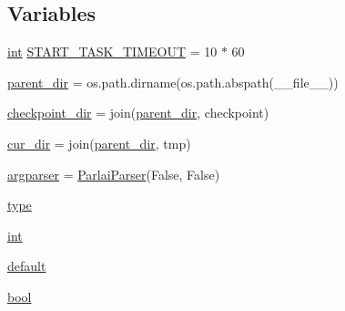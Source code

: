 \subsection*{Variables}
\begin{DoxyCompactItemize}
\item 
\hyperlink{namespaceprojects_1_1mastering__the__dungeon_1_1mturk_1_1tasks_1_1MTD_1_1run_a693eb03afbb820bbfe8b47b12e69e519}{int} \hyperlink{namespaceprojects_1_1mastering__the__dungeon_1_1mturk_1_1tasks_1_1MTD_1_1run_af458de97c8b5509492347c345c246acd}{S\+T\+A\+R\+T\+\_\+\+T\+A\+S\+K\+\_\+\+T\+I\+M\+E\+O\+UT} = 10 $\ast$ 60
\item 
\hyperlink{namespaceprojects_1_1mastering__the__dungeon_1_1mturk_1_1tasks_1_1MTD_1_1run_ab906f496406f366fa9a0890f218382fc}{parent\+\_\+dir} = os.\+path.\+dirname(os.\+path.\+abspath(\+\_\+\+\_\+file\+\_\+\+\_\+))
\item 
\hyperlink{namespaceprojects_1_1mastering__the__dungeon_1_1mturk_1_1tasks_1_1MTD_1_1run_ae9ff32a31f22bf6e12fc9d6f7e6b7866}{checkpoint\+\_\+dir} = join(\hyperlink{namespaceprojects_1_1mastering__the__dungeon_1_1mturk_1_1tasks_1_1MTD_1_1run_ab906f496406f366fa9a0890f218382fc}{parent\+\_\+dir}, \textquotesingle{}checkpoint\textquotesingle{})
\item 
\hyperlink{namespaceprojects_1_1mastering__the__dungeon_1_1mturk_1_1tasks_1_1MTD_1_1run_a402778951c7151a46a1a7d74f1a21026}{cur\+\_\+dir} = join(\hyperlink{namespaceprojects_1_1mastering__the__dungeon_1_1mturk_1_1tasks_1_1MTD_1_1run_ab906f496406f366fa9a0890f218382fc}{parent\+\_\+dir}, \textquotesingle{}tmp\textquotesingle{})
\item 
\hyperlink{namespaceprojects_1_1mastering__the__dungeon_1_1mturk_1_1tasks_1_1MTD_1_1run_ae62c7962cac2f39a21dc264912b974c0}{argparser} = \hyperlink{classparlai_1_1core_1_1params_1_1ParlaiParser}{Parlai\+Parser}(False, False)
\item 
\hyperlink{namespaceprojects_1_1mastering__the__dungeon_1_1mturk_1_1tasks_1_1MTD_1_1run_a0d607cd3866953f5de198f609be7c0fc}{type}
\item 
\hyperlink{namespaceprojects_1_1mastering__the__dungeon_1_1mturk_1_1tasks_1_1MTD_1_1run_a693eb03afbb820bbfe8b47b12e69e519}{int}
\item 
\hyperlink{namespaceprojects_1_1mastering__the__dungeon_1_1mturk_1_1tasks_1_1MTD_1_1run_a1315d0bb7e5868ecaadd5daf60275bb1}{default}
\item 
\hyperlink{namespaceprojects_1_1mastering__the__dungeon_1_1mturk_1_1tasks_1_1MTD_1_1run_a6fc0c9b519a36f82b65bcd398f1fbb9d}{bool}

\end{DoxyCompactItemize}
